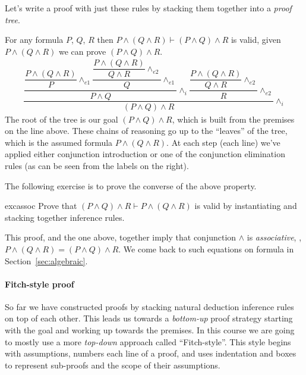 Let's write a proof with just these rules by stacking them together
into a \emph{proof tree}.

\begin{example}
\label{exm:assoc-conj}
  For any formula $P$, $Q$, $R$ then $P \wedge (Q \wedge
  R) \vdash (P \wedge Q) \wedge R$ is valid, \ie{} given $P \wedge (Q \wedge
  R)$ we can prove $(P \wedge Q) \wedge R$.
%
\newcommand{\conge}[1]{\wedge_{e#1}}
  \begin{align*}
    \dfrac{
    \dfrac{\dfrac{P \wedge (Q \wedge R)}
    {P}\conge{1}
    \dfrac{\dfrac{P \wedge (Q \wedge R)}
    {Q \wedge R} \conge{2}}{Q} \conge{1}}
    {P \wedge Q} {\wedge_i}
    \dfrac{\dfrac{P \wedge (Q \wedge R)}
    {Q \wedge R} \conge{2}}{R} \conge{2}}
    {(P \wedge Q) \wedge R} {\wedge_i}
  \end{align*}
The root of the tree is our goal $(P \wedge Q) \wedge R$, which is
built from the premises on the line above. These chains of reasoning
go up to the ``leaves'' of the tree, which is the assumed formula
$P \wedge (Q \wedge R)$. At each step (each line) we've applied
either conjunction introduction or one of the conjunction elimination
rules (as can be seen from the labels on the right).
\end{example}
\noindent
The following exercise is to prove the converse of the above property.
%
\begin{restatable}{exc}{assoc}
  \label{exm:assoc}
  Prove that $(P \wedge Q) \wedge R \vdash P \wedge (Q \wedge R)$ is
  valid by instantiating and stacking together inference rules.
\end{restatable}
%
This proof, and the one above, together imply that conjunction
$\wedge$ is \emph{associative}, \ie{},
$P \wedge (Q \wedge R) = (P \wedge Q) \wedge R$. We come back
to such equations on formula in Section~\ref{sec:algebraic}.

\paragraph{Fitch-style proof}
So far we have constructed proofs by stacking natural
deduction inference rules on top of each other. This leads us towards a
\emph{bottom-up} proof strategy starting with the goal and working up
towards the premises. In this course we are going to mostly use a more
\emph{top-down} approach called ``Fitch-style''. This style begins
with assumptions, numbers each line of a proof, and uses indentation
and boxes to represent sub-proofs and the scope of their assumptions.

